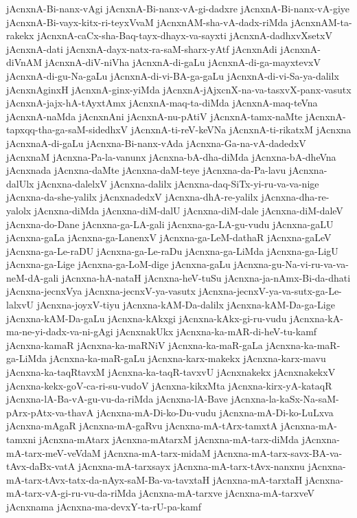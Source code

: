 {jAcnxnA-Bi-nanx-vAgi
jAcnxnA-Bi-nanx-vA-gi-dadxre
jAcnxnA-Bi-nanx-vA-giye
jAcnxnA-Bi-vayx-kitx-ri-teyxVvaM
jAcnxnAM-sha-vA-dadx-riMda
jAcnxnAM-ta-rakekx
jAcnxnA-caCx-sha-Baq-tayx-dhayx-va-sayxti
jAcnxnA-dadhxvXsetxV
jAcnxnA-dati
jAcnxnA-dayx-natx-ra-saM-sharx-yAtf
jAcnxnAdi
jAcnxnA-diVnAM
jAcnxnA-diV-niVha
jAcnxnA-di-gaLu
jAcnxnA-di-ga-mayxtevxV
jAcnxnA-di-gu-Na-gaLu
jAcnxnA-di-vi-BA-ga-gaLu
jAcnxnA-di-vi-Sa-ya-dalilx
jAcnxnAginxH
jAcnxnA-ginx-yiMda
jAcnxnA-jAjxcnX-na-va-tasxvX-panx-vasutx
jAcnxnA-jajx-hA-tAyxtAmx
jAcnxnA-maq-ta-diMda
jAcnxnA-maq-teVna
jAcnxnA-naMda
jAcnxnAni
jAcnxnA-nu-pAtiV
jAcnxnA-tamx-naMte
jAcnxnA-tapxqq-tha-ga-saM-sidedhxV
jAcnxnA-ti-reV-keVNa
jAcnxnA-ti-rikatxM
jAcnxna
jAcnxnaA-di-gaLu
jAcnxna-Bi-nanx-vAda
jAcnxna-Ga-na-vA-dadedxV
jAcnxnaM
jAcnxna-Pa-la-vanunx
jAcnxna-bA-dha-diMda
jAcnxna-bA-dheVna
jAcnxnada
jAcnxna-daMte
jAcnxna-daM-teye
jAcnxna-da-Pa-lavu
jAcnxna-dalUlx
jAcnxna-dalelxV
jAcnxna-dalilx
jAcnxna-daq-SiTx-yi-ru-va-va-nige
jAcnxna-da-she-yalilx
jAcnxnadedxV
jAcnxna-dhA-re-yalilx
jAcnxna-dha-re-yalolx
jAcnxna-diMda
jAcnxna-diM-dalU
jAcnxna-diM-dale
jAcnxna-diM-daleV
jAcnxna-do-Dane
jAcnxna-ga-LA-gali
jAcnxna-ga-LA-gu-vudu
jAcnxna-gaLU
jAcnxna-gaLa
jAcnxna-ga-LanenxV
jAcnxna-ga-LeM-dathaR
jAcnxna-gaLeV
jAcnxna-ga-Le-raDU
jAcnxna-ga-Le-raDu
jAcnxna-ga-LiMda
jAcnxna-ga-LigU
jAcnxna-ga-Lige
jAcnxna-ga-LoM-dige
jAcnxna-gaLu
jAcnxna-gu-Na-vi-ru-va-va-neM-dA-gali
jAcnxna-hA-nataH
jAcnxna-heV-tuSu
jAcnxna-ja-nAmx-Bi-da-dhati
jAcnxna-jecnxVya
jAcnxna-jecnxV-ya-vasutx
jAcnxna-jecnxV-ya-va-sutx-ga-Le-lalxvU
jAcnxna-joyxV-tiyu
jAcnxna-kAM-Da-dalilx
jAcnxna-kAM-Da-ga-Lige
jAcnxna-kAM-Da-gaLu
jAcnxna-kAkxgi
jAcnxna-kAkx-gi-ru-vudu
jAcnxna-kA-ma-ne-yi-dadx-va-ni-gAgi
jAcnxnakUkx
jAcnxna-ka-mAR-di-heV-tu-kamf
jAcnxna-kamaR
jAcnxna-ka-maRNiV
jAcnxna-ka-maR-gaLa
jAcnxna-ka-maR-ga-LiMda
jAcnxna-ka-maR-gaLu
jAcnxna-karx-makekx
jAcnxna-karx-mavu
jAcnxna-ka-taqRtavxM
jAcnxna-ka-taqR-tavxvU
jAcnxnakekx
jAcnxnakekxV
jAcnxna-kekx-goV-ca-ri-su-vudoV
jAcnxna-kikxMta
jAcnxna-kirx-yA-kataqR
jAcnxna-lA-Ba-vA-gu-vu-da-riMda
jAcnxna-lA-Bave
jAcnxna-la-kaSx-Na-saM-pArx-pAtx-va-thavA
jAcnxna-mA-Di-ko-Du-vudu
jAcnxna-mA-Di-ko-LuLxva
jAcnxna-mAgaR
jAcnxna-mA-gaRvu
jAcnxna-mA-tArx-tamxtA
jAcnxna-mA-tamxni
jAcnxna-mAtarx
jAcnxna-mAtarxM
jAcnxna-mA-tarx-diMda
jAcnxna-mA-tarx-meV-veVdaM
jAcnxna-mA-tarx-midaM
jAcnxna-mA-tarx-savx-BA-va-tAvx-daBx-vatA
jAcnxna-mA-tarxsayx
jAcnxna-mA-tarx-tAvx-nanxnu
jAcnxna-mA-tarx-tAvx-tatx-da-nAyx-saM-Ba-va-tavxtaH
jAcnxna-mA-tarxtaH
jAcnxna-mA-tarx-vA-gi-ru-vu-da-riMda
jAcnxna-mA-tarxve
jAcnxna-mA-tarxveV
jAcnxnama
jAcnxna-ma-devxY-ta-rU-pa-kamf
}
